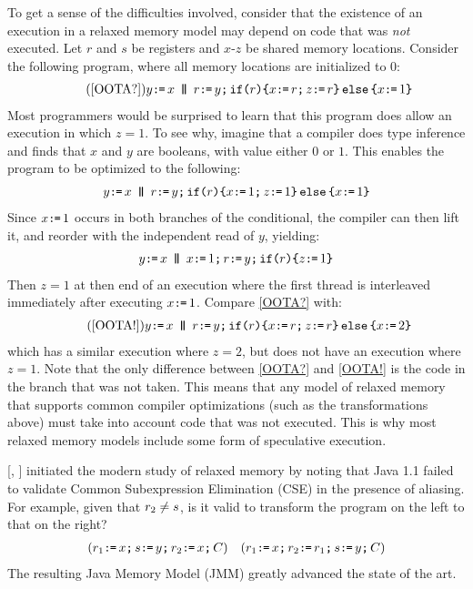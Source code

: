 To get a sense of the difficulties involved,
consider that the existence of an execution in a relaxed memory model may
depend on code that was \emph{not} executed. Let $r$ and $s$ be registers and
$x$-$z$ be shared memory locations.  Consider the following program, where
all memory locations are initialized to $0$:
\begin{gather}
  \tag{\ref{OOTA?}}
    y\GETS x
  \PAR
  r\GETS y\SEMI\IF{r}\THEN 
  x\GETS r\SEMI z\GETS r \ELSE x\GETS1 \FI
\end{gather}
Most programmers would be surprised to learn that this program does allow an
execution in which $z=1$. To see why, imagine that a compiler does type
inference and finds that $x$ and $y$ are booleans, with value either $0$ or
$1$.  This enables the program to be optimized to the following:
\begin{gather*}
    y\GETS x
  \PAR
  r\GETS y\SEMI\IF{r}\THEN 
  x\GETS 1\SEMI z\GETS 1 \ELSE x\GETS1 \FI
\end{gather*}
Since $x\texttt{:}\mkern-1mu\texttt{=}\,1$ occurs in both branches of the conditional, the compiler can
then lift it, and reorder with the independent read of $y$, yielding:
\begin{gather*}
    y\GETS x
  \PAR
  x\GETS1\SEMI
  r\GETS y\SEMI\IF{r}\THEN z\GETS 1 \FI
\end{gather*}
Then $z=1$ at then end of an execution where the first thread is interleaved
immediately after executing $x\texttt{:}\mkern-1mu\texttt{=}\,1$.  Compare \eqref{OOTA?} with:
\begin{gather}
  \tag{\ref{OOTA!}}
    y\GETS x
  \PAR
  r\GETS y\SEMI \IF{r}\THEN 
  x\GETS r\SEMI z\GETS r \ELSE x\GETS2 \FI
\end{gather}
which has a similar execution where $z=2$, but does not have an execution
where $z=1$. Note that the only difference between \eqref{OOTA?} and
\eqref{OOTA!} is the code in the branch that was not taken. This means that
any model of relaxed memory that supports common compiler optimizations (such
as the transformations above) must take into account code that was not
executed. This is why most relaxed memory models include some form of
speculative execution.



\citeauthor{DBLP:conf/java/Pugh99} [\citeyear{DBLP:conf/java/Pugh99},
] initiated the modern study of relaxed memory by noting that
Java 1.1 failed to validate Common Subexpression Elimination (CSE) in the
presence of aliasing. For example, given that $r_2\neq s$, is it valid
to transform the program on the left to that on the right?
\begin{align*}
  ({r_1\texttt{:}\mkern-1mu\texttt{=}\, x \texttt{;}\,\allowbreak
  s\texttt{:}\mkern-1mu\texttt{=}\, y \texttt{;}\,\allowbreak  
  r_2\texttt{:}\mkern-1mu\texttt{=}\, x\texttt{;}\,\allowbreak C})
&&
  ({r_1\texttt{:}\mkern-1mu\texttt{=}\, x \texttt{;}\,\allowbreak     
    r_2\texttt{:}\mkern-1mu\texttt{=}\, r_1\texttt{;}\,\allowbreak
    s\texttt{:}\mkern-1mu\texttt{=}\, y \texttt{;}\,\allowbreak C})
\end{align*}
The resulting Java Memory Model (JMM) \cite{Manson:2005:JMM:1047659.1040336}
greatly advanced the state of the art.


